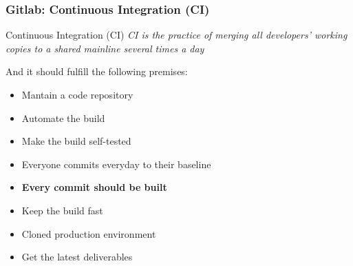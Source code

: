 \begin{frame}

\frametitle{Gitlab: Continuous Integration (CI)}

\begin{block}{Continuous Integration (CI)}
\textit{CI is the practice of merging all developers' working copies to a shared mainline several times a day}
\end{block}

\pause

And it should fulfill the following premises:

\begin{itemize}[<+->]

\item Mantain a code repository
\item Automate the build
\item Make the build self-tested
\item Everyone commits everyday to their baseline
\item \textbf{Every commit should be built}
\item Keep the build fast
\item Cloned production environment
\item Get the latest deliverables

\end{itemize}
\end{frame}